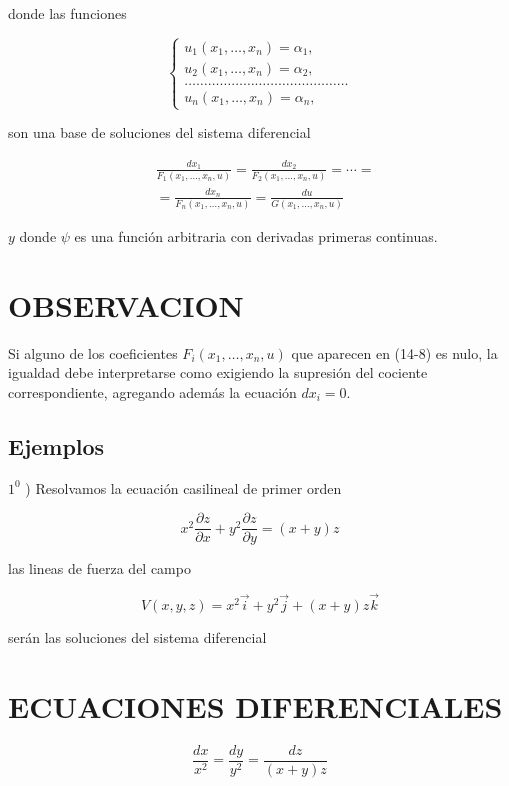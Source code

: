 \documentclass[10pt]{article}
\theoremstyle{plain}
\theoremstyle{definition}
\theoremstyle{remark}
\begin{document}
donde las funciones


$$
\left\{\begin{array}{l}
u_{1}\left(x_{1}, \ldots, x_{n}\right)=\alpha_{1}, \\
u_{2}\left(x_{1}, \ldots, x_{n}\right)=\alpha_{2}, \\
\ldots \ldots \ldots \ldots \ldots \ldots \ldots \ldots \ldots \ldots \ldots \ldots \ldots \ldots \\
u_{n}\left(x_{1}, \ldots, x_{n}\right)=\alpha_{n},
\end{array}\right.
$$

son una base de soluciones del sistema diferencial


\begin{align*}
& \frac{d x_{1}}{F_{1}\left(x_{1}, \ldots, x_{n}, u\right)}=\frac{d x_{2}}{F_{2}\left(x_{1}, \ldots, x_{n}, u\right)}=\cdots= \\
& =\frac{d x_{n}}{F_{n}\left(x_{1}, \ldots, x_{n}, u\right)}=\frac{d u}{G\left(x_{1}, \ldots, x_{n}, u\right)} \tag{14-8}
\end{align*}


$y$ donde $\psi$ es una función arbitraria con derivadas primeras continuas.

\section*{OBSERVACION}
Si alguno de los coeficientes $F_{i}\left(x_{1}, \ldots, x_{n}, u\right)$ que aparecen en (14-8) es nulo, la igualdad debe interpretarse como exigiendo la supresión del cociente correspondiente, agregando además la ecuación $d x_{i}=0$.

\subsection{Ejemplos}
$1^{0}$ ) Resolvamos la ecuación casilineal de primer orden


\begin{equation*}
x^{2} \frac{\partial z}{\partial x}+y^{2} \frac{\partial z}{\partial y}=(x+y) z \tag{14-9}
\end{equation*}


las lineas de fuerza del campo

$$
V(x, y, z)=x^{2} \vec{i}+y^{2} \vec{j}+(x+y) z \vec{k}
$$

serán las soluciones del sistema diferencial

\section*{ECUACIONES DIFERENCIALES}
$$
\frac{d x}{x^{2}}=\frac{d y}{y^{2}}=\frac{d z}{(x+y) z}
$$
\end{document}
